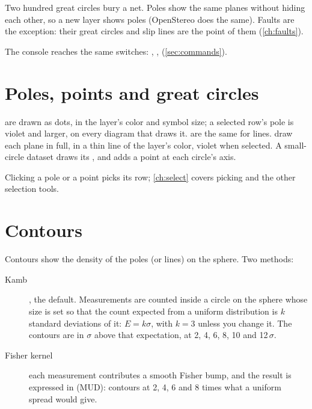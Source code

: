 \begin{why}
Two hundred great circles bury a net. Poles show the same planes without hiding each other, so a new
layer shows poles (OpenStereo does the same). Faults are the exception: their great circles and slip
lines are the point of them (\cref{ch:faults}).
\end{why}

The console reaches the same switches: , , 
(\cref{sec:commands}).

\section{Poles, points and great circles}

 are drawn as dots, in the layer's color and symbol size; a selected row's pole is
violet and larger, on every diagram that draws it.  are the same for lines.
 draw each plane in full, in a thin line of the layer's color, violet
when selected. A small-circle dataset draws its , and
 adds a point at each circle's axis.

Clicking a pole or a point picks its row; \cref{ch:select} covers picking and the other selection tools.

\section{Contours}\label{sec:contours}

Contours show the density of the poles (or lines) on the sphere. Two methods:

\begin{description}
\item[Kamb] \parencite{kamb1959}, the default. Measurements are counted inside a circle on the sphere whose
size is set so that the count expected from a uniform distribution is $k$ standard deviations of it:
$E = k\sigma$, with $k = 3$ unless you change it. The contours are in $\sigma$ above that expectation, at
2, 4, 6, 8, 10 and 12\,$\sigma$.
\item[Fisher kernel] each measurement contributes a smooth Fisher bump, and the result is expressed in
 (MUD): contours at 2, 4, 6 and 8 times
what a uniform spread would give.
\end{description}

